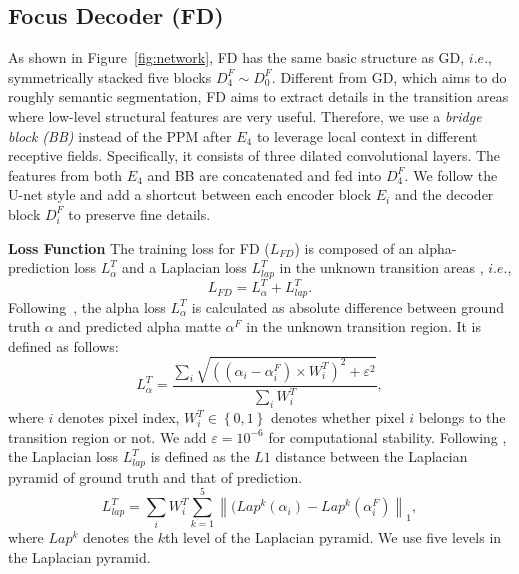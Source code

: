 \documentclass[twocolumn]{svjour3}
\begin{document}
\subsection{Focus Decoder (FD)}
As shown in Figure~\ref{fig:network}, FD has the same basic structure as GD, $i.e.$, symmetrically stacked five blocks $D^F_4 \sim D^F_0$. Different from GD, which aims to do roughly semantic segmentation, FD aims to extract details in the transition areas where low-level structural features are very useful. Therefore, we use a \textit{bridge block (BB)} \citep{Qin_2019_CVPR} instead of the PPM after $E_4$ to leverage local context in different receptive fields. Specifically, it consists of three dilated convolutional layers. The features from both $E_4$ and BB are concatenated and fed into $D^F_4$. We follow the U-net \citep{ronneberger2015u} style and add a shortcut between each encoder block $E_i$ and the decoder block $D^F_i$ to preserve fine details.

\textbf{Loss Function} The training loss for FD ($L_{FD}$) is composed of an alpha-prediction loss $L_{\alpha}^T$ and a Laplacian loss $L_{lap}^T$ in the unknown transition areas \citep{hou2019context}, $i.e.$,
\begin{equation}
L_{FD} = L_{\alpha}^T + L_{lap}^T.
\end{equation}
Following~\citep{xu2017deep}, the alpha loss $L_{\alpha}^T$ is calculated as absolute difference between ground truth $\alpha$ and predicted alpha matte $\alpha^{F}$ in the unknown transition region. It is defined as follows:
\begin{equation}
L_{\alpha}^T = \frac{\sum_{i}\sqrt{\left ( \left ( \alpha_{i}-\alpha_{i}^{F} \right )\times W^{T}_{i} \right )^{2}+\varepsilon^{2}}}{\sum_{i}W^{T}_{i}},
\label{equa:alpha_t}
\end{equation}
where $i$ denotes pixel index, $W^{T}_{i}\in \left \{ 0,1 \right \}$ denotes whether pixel $i$ belongs to the transition region or not. We add $\varepsilon=10^{-6}$ for computational stability. Following \citep{hou2019context}, the Laplacian loss $L_{lap}^T$ is defined as the $L1$ distance between the Laplacian pyramid of ground truth and that of prediction.
\begin{equation}
L_{lap}^T = {\sum_{i}W^{T}_{i}}\sum_{k=1}^{5}\left \|(Lap^k({\alpha_i})-Lap^k({\alpha^{F}_i}) \right \|_1,
\label{equa:lap_t}
\end{equation}
where $Lap^k$ denotes the $k$th level of the Laplacian pyramid. We use five levels in the Laplacian pyramid.
\end{document}
